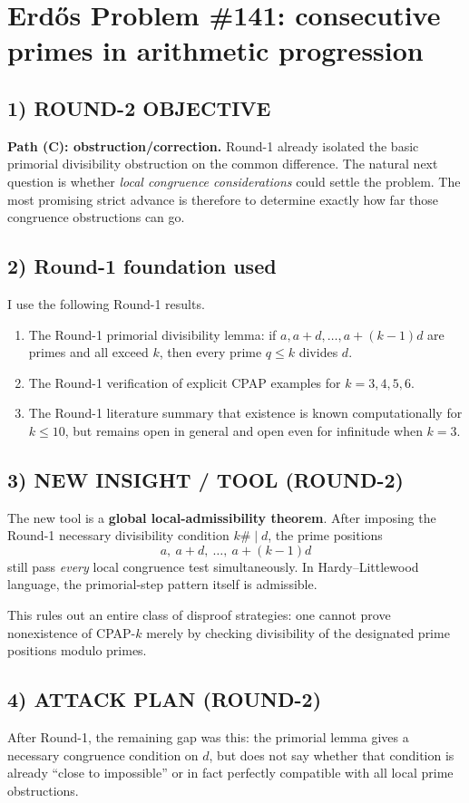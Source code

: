 \section{Erd\H{o}s Problem \#141: consecutive primes in arithmetic progression}

\subsection*{1) ROUND-2 OBJECTIVE}
\textbf{Path (C): obstruction/correction.}  Round-1 already isolated the basic primorial divisibility obstruction on the common difference.  The natural next question is whether \emph{local congruence considerations} could settle the problem.  The most promising strict advance is therefore to determine exactly how far those congruence obstructions can go.

\subsection*{2) Round-1 foundation used}
I use the following Round-1 results.
\begin{enumerate}
\item The Round-1 primorial divisibility lemma: if $a,a+d,\dots,a+(k-1)d$ are primes and all exceed $k$, then every prime $q\le k$ divides $d$.
\item The Round-1 verification of explicit CPAP examples for $k=3,4,5,6$.
\item The Round-1 literature summary that existence is known computationally for $k\le 10$, but remains open in general and open even for infinitude when $k=3$.
\end{enumerate}

\subsection*{3) NEW INSIGHT / TOOL (ROUND-2)}
The new tool is a \textbf{global local-admissibility theorem}.
After imposing the Round-1 necessary divisibility condition $k\#\mid d$, the prime positions
\[
a,\ a+d,\ \dots,\ a+(k-1)d
\]
still pass \emph{every} local congruence test simultaneously.  In Hardy--Littlewood language, the primorial-step pattern itself is admissible.

This rules out an entire class of disproof strategies: one cannot prove nonexistence of CPAP-$k$ merely by checking divisibility of the designated prime positions modulo primes.

\subsection*{4) ATTACK PLAN (ROUND-2)}
After Round-1, the remaining gap was this: the primorial lemma gives a necessary congruence condition on $d$, but does not say whether that condition is already ``close to impossible'' or in fact perfectly compatible with all local prime obstructions.

